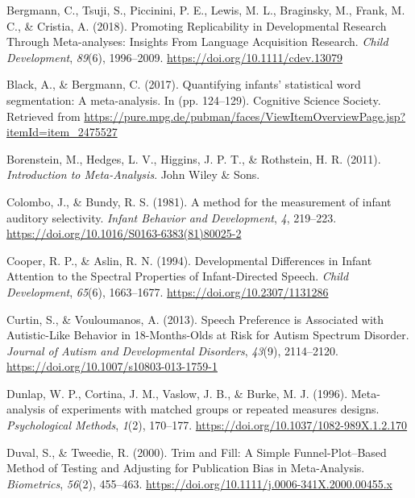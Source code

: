 \documentclass[
  man]{apa6}
\begin{document}
\leavevmode\hypertarget{ref-bergmann_promoting_2018}{}%
Bergmann, C., Tsuji, S., Piccinini, P. E., Lewis, M. L., Braginsky, M., Frank, M. C., \& Cristia, A. (2018). Promoting Replicability in Developmental Research Through Meta-analyses: Insights From Language Acquisition Research. \emph{Child Development}, \emph{89}(6), 1996--2009. \url{https://doi.org/10.1111/cdev.13079}

\leavevmode\hypertarget{ref-black_quantifying_2017}{}%
Black, A., \& Bergmann, C. (2017). Quantifying infants' statistical word segmentation: A meta-analysis. In (pp. 124--129). Cognitive Science Society. Retrieved from \url{https://pure.mpg.de/pubman/faces/ViewItemOverviewPage.jsp?itemId=item_2475527}

\leavevmode\hypertarget{ref-borenstein_introduction_2011}{}%
Borenstein, M., Hedges, L. V., Higgins, J. P. T., \& Rothstein, H. R. (2011). \emph{Introduction to Meta-Analysis}. John Wiley \& Sons.

\leavevmode\hypertarget{ref-colombo_method_1981}{}%
Colombo, J., \& Bundy, R. S. (1981). A method for the measurement of infant auditory selectivity. \emph{Infant Behavior and Development}, \emph{4}, 219--223. \url{https://doi.org/10.1016/S0163-6383(81)80025-2}

\leavevmode\hypertarget{ref-cooper_developmental_1994}{}%
Cooper, R. P., \& Aslin, R. N. (1994). Developmental Differences in Infant Attention to the Spectral Properties of Infant-Directed Speech. \emph{Child Development}, \emph{65}(6), 1663--1677. \url{https://doi.org/10.2307/1131286}

\leavevmode\hypertarget{ref-curtin_speech_2013}{}%
Curtin, S., \& Vouloumanos, A. (2013). Speech Preference is Associated with Autistic-Like Behavior in 18-Months-Olds at Risk for Autism Spectrum Disorder. \emph{Journal of Autism and Developmental Disorders}, \emph{43}(9), 2114--2120. \url{https://doi.org/10.1007/s10803-013-1759-1}

\leavevmode\hypertarget{ref-dunlap_meta-analysis_1996}{}%
Dunlap, W. P., Cortina, J. M., Vaslow, J. B., \& Burke, M. J. (1996). Meta-analysis of experiments with matched groups or repeated measures designs. \emph{Psychological Methods}, \emph{1}(2), 170--177. \url{https://doi.org/10.1037/1082-989X.1.2.170}

\leavevmode\hypertarget{ref-duval_trim_2000}{}%
Duval, S., \& Tweedie, R. (2000). Trim and Fill: A Simple Funnel-Plot--Based Method of Testing and Adjusting for Publication Bias in Meta-Analysis. \emph{Biometrics}, \emph{56}(2), 455--463. \url{https://doi.org/10.1111/j.0006-341X.2000.00455.x}
\end{document}
